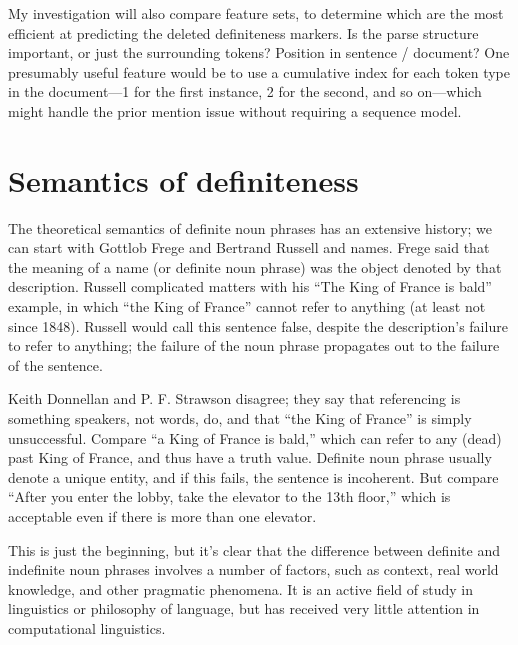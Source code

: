 \documentclass[11pt]{article}
\begin{document}
My investigation will also compare feature sets, to determine which are the most efficient at predicting the deleted definiteness markers. Is the parse structure important, or just the surrounding tokens? Position in sentence / document? One presumably useful feature would be to use a cumulative index for each token type in the document---1 for the first instance, 2 for the second, and so on---which might handle the prior mention issue without requiring a sequence model.

\section{}




\section{Semantics of definiteness}
The theoretical semantics of definite noun phrases has an extensive history; we can start with Gottlob Frege and Bertrand Russell and names. Frege said that the meaning of a name (or definite noun phrase) was the object denoted by that description. Russell complicated matters with his ``The King of France is bald'' example, in which ``the King of France'' cannot refer to anything (at least not since 1848). Russell would call this sentence false, despite the description's failure to refer to anything; the failure of the noun phrase propagates out to the failure of the sentence.

Keith Donnellan and P. F. Strawson disagree; they say that referencing is something speakers, not words, do, and that ``the King of France'' is simply unsuccessful.
Compare ``a King of France is bald,'' which can refer to any (dead) past King of France, and thus have a truth value. Definite noun phrase usually denote a unique entity, and if this fails, the sentence is incoherent. But compare ``After you enter the lobby, take the elevator to the 13th floor,'' which is acceptable even if there is more than one elevator.

This is just the beginning, but it's clear that the difference between definite and indefinite noun phrases involves a number of factors, such as context, real world knowledge, and other pragmatic phenomena. It is an active field of study in linguistics or philosophy of language, but has received very little attention in computational linguistics.
\end{document}
